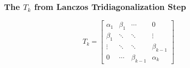 \begin{frame}[plain]
	\frametitle{The $T_k$ from Lanczos Tridiagonalization Step}
	\begin{block}{}
    \[
    T_k = 
    \begin{bmatrix}
      \alpha_1 & \beta_1 & \cdots      & 0          \\
      \beta_1  & \ddots  & \ddots      & \vdots     \\
      \vdots   & \ddots  & \ddots      & \beta_{k-1} \\
      0        & \cdots  & \beta_{k-1} & \alpha_k
    \end{bmatrix}
    \]
    \hfill
	\end{block}
\end{frame}
